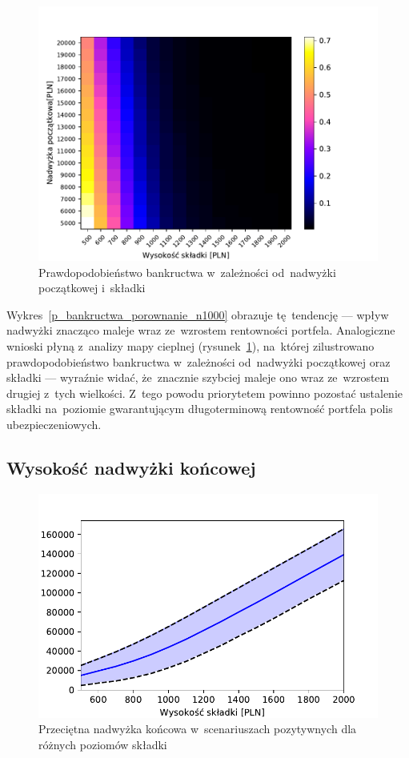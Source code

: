 \documentclass[12pt, a4paper, oneside]{mwart} %
\begin{document}
\begin{figure}
\centering
\caption{Prawdopodobieństwo bankructwa w~zależności od~nadwyżki początkowej i~składki}
\label{p_heatmapa_bankructwo}
\includegraphics[width = \textwidth]{wykresy/p_heatmapa_bankructwo.pdf}
\end{figure}

Wykres~\ref{p_bankructwa_porownanie_n1000} obrazuje tę~tendencję --- wpływ nadwyżki znacząco maleje wraz ze~wzrostem rentowności portfela. Analogiczne wnioski płyną z~analizy mapy cieplnej (rysunek~\ref{p_heatmapa_bankructwo}), na~której zilustrowano prawdopodobieństwo bankructwa w~zależności od~nadwyżki początkowej oraz składki --- wyraźnie widać, że~znacznie szybciej maleje ono wraz ze~wzrostem drugiej z~tych wielkości. Z~tego powodu priorytetem powinno pozostać ustalenie składki na~poziomie gwarantującym długoterminową rentowność portfela polis ubezpieczeniowych.

\subsection{Wysokość nadwyżki końcowej}

\begin{figure}
\centering
\caption{Przeciętna nadwyżka końcowa w~scenariuszach pozytywnych dla różnych poziomów składki}
\label{nadwyzka_n1000}
\includegraphics[width = \textwidth]{wykresy/nadwyzka.pdf}
\end{figure}
\end{document}
